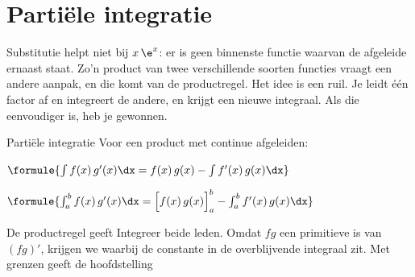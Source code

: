 
\begin{oefeningen}
\end{oefeningen}

\section{Partiële integratie}

Substitutie helpt niet bij $x\,\e^x$: er is geen binnenste functie waarvan de afgeleide ernaast staat. Zo'n product van twee verschillende soorten functies vraagt een andere aanpak, en die komt van de productregel. Het idee is een ruil. Je leidt één factor af en integreert de andere, en krijgt een nieuwe integraal. Als die eenvoudiger is, heb je gewonnen.

\begin{theorie}
\begin{stelling}{Partiële integratie}
Voor een product met continue afgeleiden:

\vspace{1mm}
\qquad $\formule{\int f(x)\,g'(x)\dx = f(x)\,g(x) - \int f'(x)\,g(x)\dx}$

\vspace{1.5mm}
\qquad $\formule{\int_a^b f(x)\,g'(x)\dx = \Bigl[f(x)\,g(x)\Bigr]_a^b - \int_a^b f'(x)\,g(x)\dx}$
\end{stelling}

\begin{bewijs}
De productregel geeft
Integreer beide leden. Omdat $fg$ een primitieve is van $(fg)'$, krijgen we
waarbij de constante in de overblijvende integraal zit. Met grenzen geeft de hoofdstelling
\end{bewijs}
\end{theorie}

